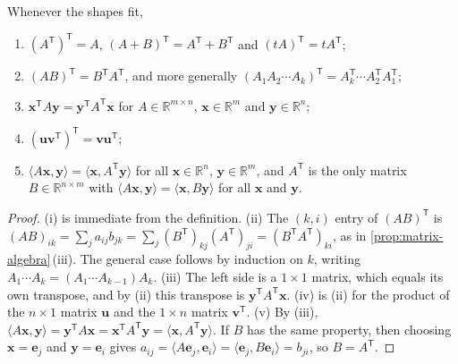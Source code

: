\begin{proposition}
\label{prop:transpose-rules}
Whenever the shapes fit,
\begin{enumerate}
\item $(A^{\mathsf T})^{\mathsf T}=A$, $(A+B)^{\mathsf T}=A^{\mathsf T}+B^{\mathsf T}$ and $(tA)^{\mathsf T}=tA^{\mathsf T}$;
\item $(AB)^{\mathsf T}=B^{\mathsf T}A^{\mathsf T}$, and more generally $(A_1A_2\cdots A_k)^{\mathsf T}=A_k^{\mathsf T}\cdots A_2^{\mathsf T}A_1^{\mathsf T}$;
\item $\mathbf x^{\mathsf T}A\mathbf y=\mathbf y^{\mathsf T}A^{\mathsf T}\mathbf x$ for $A\in\mathbb R^{m\times n}$, $\mathbf x\in\mathbb R^m$ and $\mathbf y\in\mathbb R^n$;
\item $(\mathbf u\mathbf v^{\mathsf T})^{\mathsf T}=\mathbf v\mathbf u^{\mathsf T}$;
\item $\langle A\mathbf x,\mathbf y\rangle=\langle\mathbf x,A^{\mathsf T}\mathbf y\rangle$ for all $\mathbf x\in\mathbb R^n$, $\mathbf y\in\mathbb R^m$, and $A^{\mathsf T}$ is the only matrix $B\in\mathbb R^{n\times m}$ with $\langle A\mathbf x,\mathbf y\rangle=\langle\mathbf x,B\mathbf y\rangle$ for all $\mathbf x$ and $\mathbf y$.
\end{enumerate}
\end{proposition}

\begin{proof}
(i) is immediate from the definition. (ii) The $(k,i)$ entry of $(AB)^{\mathsf T}$ is $(AB)_{ik}=\sum_ja_{ij}b_{jk}=\sum_j(B^{\mathsf T})_{kj}(A^{\mathsf T})_{ji}=(B^{\mathsf T}A^{\mathsf T})_{ki}$, as in \cref{prop:matrix-algebra}\,(iii). The general case follows by induction on $k$, writing $A_1\cdots A_k=(A_1\cdots A_{k-1})A_k$. (iii) The left side is a $1\times1$ matrix, which equals its own transpose, and by (ii) this transpose is $\mathbf y^{\mathsf T}A^{\mathsf T}\mathbf x$. (iv) is (ii) for the product of the $n\times1$ matrix $\mathbf u$ and the $1\times n$ matrix $\mathbf v^{\mathsf T}$. (v) By (iii), $\langle A\mathbf x,\mathbf y\rangle=\mathbf y^{\mathsf T}A\mathbf x=\mathbf x^{\mathsf T}A^{\mathsf T}\mathbf y=\langle\mathbf x,A^{\mathsf T}\mathbf y\rangle$. If $B$ has the same property, then choosing $\mathbf x=\mathbf e_j$ and $\mathbf y=\mathbf e_i$ gives $a_{ij}=\langle A\mathbf e_j,\mathbf e_i\rangle=\langle\mathbf e_j,B\mathbf e_i\rangle=b_{ji}$, so $B=A^{\mathsf T}$.
\end{proof}

